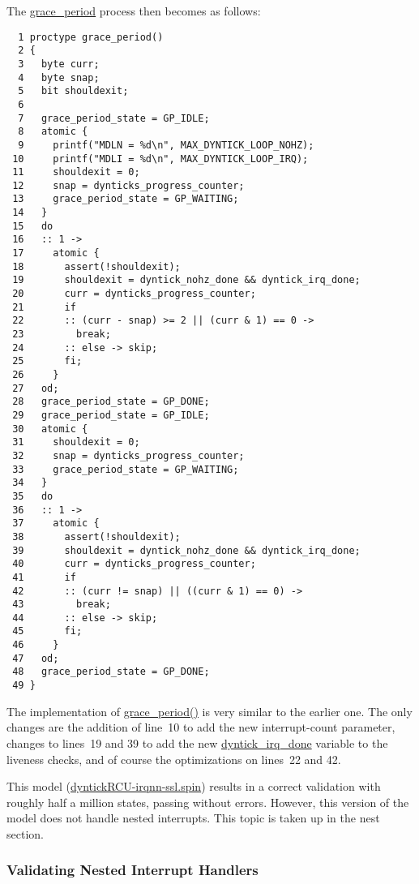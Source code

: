 \QuickQuizEnd

The \url{grace_period} process then becomes as follows:

{ \scriptsize
\begin{verbatim}
  1 proctype grace_period()
  2 {
  3   byte curr;
  4   byte snap;
  5   bit shouldexit;
  6 
  7   grace_period_state = GP_IDLE;
  8   atomic {
  9     printf("MDLN = %d\n", MAX_DYNTICK_LOOP_NOHZ);
 10     printf("MDLI = %d\n", MAX_DYNTICK_LOOP_IRQ);
 11     shouldexit = 0;
 12     snap = dynticks_progress_counter;
 13     grace_period_state = GP_WAITING;
 14   }
 15   do
 16   :: 1 ->
 17     atomic {
 18       assert(!shouldexit);
 19       shouldexit = dyntick_nohz_done && dyntick_irq_done;
 20       curr = dynticks_progress_counter;
 21       if
 22       :: (curr - snap) >= 2 || (curr & 1) == 0 ->
 23         break;
 24       :: else -> skip;
 25       fi;
 26     }
 27   od;
 28   grace_period_state = GP_DONE;
 29   grace_period_state = GP_IDLE;
 30   atomic {
 31     shouldexit = 0;
 32     snap = dynticks_progress_counter;
 33     grace_period_state = GP_WAITING;
 34   }
 35   do
 36   :: 1 ->
 37     atomic {
 38       assert(!shouldexit);
 39       shouldexit = dyntick_nohz_done && dyntick_irq_done;
 40       curr = dynticks_progress_counter;
 41       if
 42       :: (curr != snap) || ((curr & 1) == 0) ->
 43         break;
 44       :: else -> skip;
 45       fi;
 46     }
 47   od;
 48   grace_period_state = GP_DONE;
 49 }
\end{verbatim}
}

The implementation of \url{grace_period()} is very similar
to the earlier one.
The only changes are the addition of line~10 to add the new
interrupt-count parameter, changes to lines~19 and 39 to
add the new \url{dyntick_irq_done} variable to the liveness
checks, and of course the optimizations on lines~22 and 42.

This model (\url{dyntickRCU-irqnn-ssl.spin})
results in a correct validation with roughly half a million
states, passing without errors.
However, this version of the model does not handle nested
interrupts.
This topic is taken up in the nest section.

\subsubsection{Validating Nested Interrupt Handlers}
\label{app:formal:Validating Nested Interrupt Handlers}

